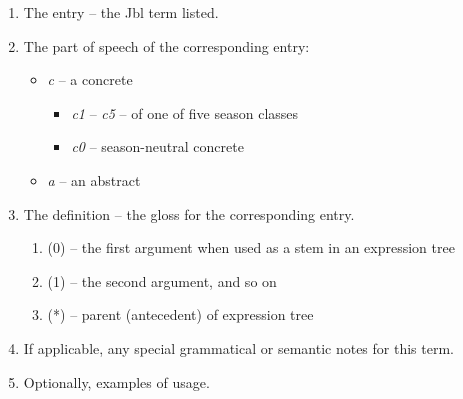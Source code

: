 \documentclass{book}
\newcommand{\lname}{Jbl}
\begin{document}
\begin{enumerate}
    \item The entry -- the \lname{} term listed.
    \item The part of speech of the corresponding entry:
    \begin{itemize}
        \item \textit{c} -- a concrete
        \begin{itemize}
            \item \textit{c1} -- \textit{c5} -- of one of five season classes
            \item \textit{c0} -- season-neutral concrete
        \end{itemize}
        \item \textit{a} -- an abstract
    \end{itemize}
    \item The definition -- the gloss for the corresponding entry.
    \begin{enumerate}
        \item (0) -- the first argument when used as a stem in an expression tree
        \item (1) -- the second argument, and so on
        \item (*) -- parent (antecedent) of expression tree
    \end{enumerate}
    \item If applicable, any special grammatical or semantic notes for this term.
    \item Optionally, examples of usage.
\end{enumerate}

\begin{multicols}{2}
    
\end{multicols}
\end{document}
